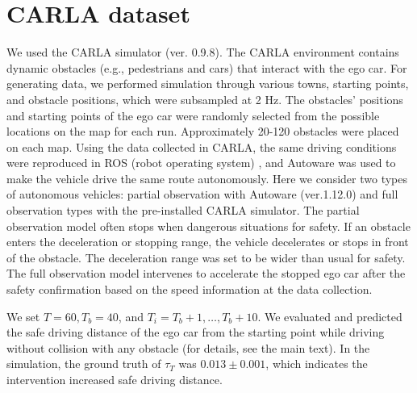\documentclass[journal]{IEEEtran}
\begin{document}
\section{CARLA dataset}
\label{app:carla}
We used the CARLA simulator \cite{dosovitskiy2017carla} (ver. 0.9.8).
The CARLA environment contains dynamic obstacles (e.g., pedestrians and cars) that interact with the ego car. For generating data, we performed simulation through various towns, starting points, and obstacle positions, which were subsampled at 2 Hz.
The obstacles' positions and starting points of the ego car were randomly selected from the possible locations on the map for each run.
Approximately 20-120 obstacles were placed on each map.
Using the data collected in CARLA, the same driving conditions were reproduced in ROS (robot operating system) \cite{quigley2009ros}, and Autoware was used to make the vehicle drive the same route autonomously.
Here we consider two types of autonomous vehicles: partial observation with Autoware \cite{kato2015open} (ver.1.12.0) and full observation types with the pre-installed CARLA simulator. 
The partial observation model often stops when dangerous situations for safety. 
If an obstacle enters the deceleration or stopping range, the vehicle decelerates or stops in front of the obstacle.
The deceleration range was set to be wider than usual for safety.
The full observation model intervenes to accelerate the stopped ego car after the safety confirmation based on the speed information at the data collection.

We set $T=60, T_b=40$, and $T_i=T_b+1,\ldots,T_b+10$.
We evaluated and predicted the safe driving distance of the ego car from the starting point while driving without collision with any obstacle (for details, see the main text). 
In the simulation, the ground truth of $\tau_T$ was $0.013 \pm 0.001$, which indicates the intervention increased safe driving distance. 
\end{document}
